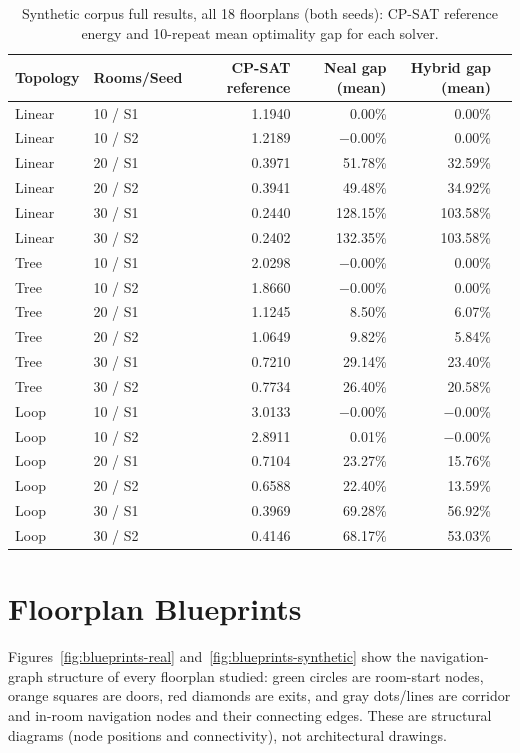 \documentclass[11pt]{article}
\begin{document}
\begin{table}[h]
\centering
\caption{Synthetic corpus full results, all 18 floorplans (both seeds): CP-SAT reference energy and 10-repeat mean optimality gap for each solver.}
\label{tab:appendixb2}
\small
\begin{tabular}{llrrrr}
\toprule
Topology & Rooms/Seed & CP-SAT reference & Neal gap (mean) & Hybrid gap (mean) \\
\midrule
Linear & 10 / S1 & 1.1940 & 0.00\% & 0.00\% \\
Linear & 10 / S2 & 1.2189 & $-$0.00\% & 0.00\% \\
Linear & 20 / S1 & 0.3971 & 51.78\% & 32.59\% \\
Linear & 20 / S2 & 0.3941 & 49.48\% & 34.92\% \\
Linear & 30 / S1 & 0.2440 & 128.15\% & 103.58\% \\
Linear & 30 / S2 & 0.2402 & 132.35\% & 103.58\% \\
Tree & 10 / S1 & 2.0298 & $-$0.00\% & 0.00\% \\
Tree & 10 / S2 & 1.8660 & $-$0.00\% & 0.00\% \\
Tree & 20 / S1 & 1.1245 & 8.50\% & 6.07\% \\
Tree & 20 / S2 & 1.0649 & 9.82\% & 5.84\% \\
Tree & 30 / S1 & 0.7210 & 29.14\% & 23.40\% \\
Tree & 30 / S2 & 0.7734 & 26.40\% & 20.58\% \\
Loop & 10 / S1 & 3.0133 & $-$0.00\% & $-$0.00\% \\
Loop & 10 / S2 & 2.8911 & 0.01\% & $-$0.00\% \\
Loop & 20 / S1 & 0.7104 & 23.27\% & 15.76\% \\
Loop & 20 / S2 & 0.6588 & 22.40\% & 13.59\% \\
Loop & 30 / S1 & 0.3969 & 69.28\% & 56.92\% \\
Loop & 30 / S2 & 0.4146 & 68.17\% & 53.03\% \\
\bottomrule
\end{tabular}
\end{table}

\section{Floorplan Blueprints}
\label{sec:appendixD}
Figures~\ref{fig:blueprints-real} and~\ref{fig:blueprints-synthetic} show the navigation-graph structure of every floorplan studied: green circles are room-start nodes, orange squares are doors, red diamonds are exits, and gray dots/lines are corridor and in-room navigation nodes and their connecting edges. These are structural diagrams (node positions and connectivity), not architectural drawings.
\end{document}
